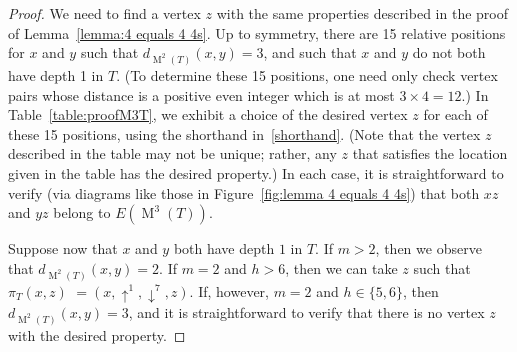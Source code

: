 \documentclass[12pt]{amsart}
\theoremstyle{definition}
\theoremstyle{remark}
\numberwithin{equation}{section}
\numberwithin{figure}{section}
\newcommand{\M}{\operatorname{M}}
\begin{document}
\begin{proof}
We need to find a vertex $z$ with the same properties described in the proof of Lemma~\ref{lemma:4 equals 4 4s}.
    Up to symmetry, there are 15 relative positions for $x$ and $y$ such that $d_{\M^2(T)}(x,y) = 3$, and such that $x$ and $y$ do not both have depth 1 in $T$.
    (To determine these 15 positions, one need only check vertex pairs whose distance is a positive even integer which is at most $3 \times 4 = 12$.)
    In Table~\ref{table:proofM3T}, we exhibit a choice of the desired vertex $z$ for each of these 15 positions, using the shorthand in~\eqref{shorthand}.
    (Note that the vertex $z$ described in the table may not be unique; rather, any $z$ that satisfies the location given in the table has the desired property.)
    In each case, it is straightforward to verify (via diagrams like those in Figure~\ref{fig:lemma 4 equals 4 4s}) that both $xz$ and $yz$ belong to $E(\M^3(T))$.

    Suppose now that $x$ and $y$ both have depth $1$ in $T$.
    If $m > 2$, then we observe that $d_{\M^2(T)}(x,y) = 2$. If $m = 2$ and $h>6$, then we can take $z$ such that $\pi_T(x,z)$ $ = (x,\uparrow^1, \downarrow^7, z)$.
    If, however, $m=2$ and $h \in \{5,6\}$, then $d_{\M^2(T)}(x,y) = 3$, and it is straightforward to verify that there is no vertex $z$ with the desired property.
\end{proof}
\end{document}
